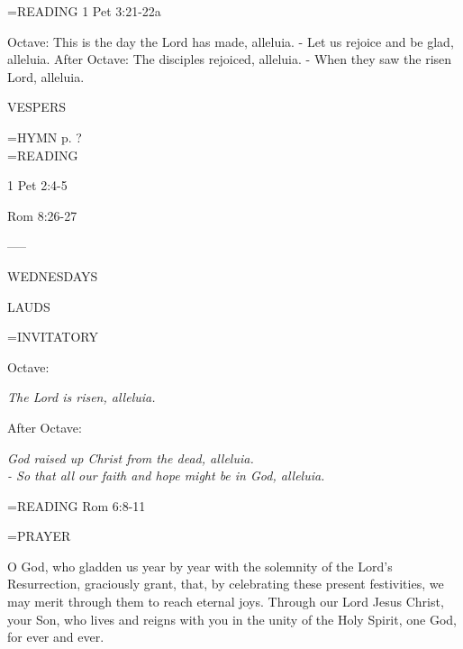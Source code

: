 \hangindent=\parindent \small{READING}    1 Pet 3:21-22a \textbf{   }

Octave:	This is the day the Lord has made, alleluia.
		- Let us rejoice and be glad, alleluia.
After Octave:	The disciples rejoiced, alleluia.
		- When they saw the risen Lord, alleluia.

\begin{flushleft}\normalsize VESPERS\\\end{flushleft}
\hangindent=\parindent \small{\uppercase{HYMN} p.  ?\\}
\hangindent=\parindent \small READING
\begin{description}[labelindent=\parindent, leftmargin=*]
\item [1st-6th Week:]     1 Pet 2:4-5 \textbf{    }
\item [7th Week:]     Rom 8:26-27 \textbf{    }
\end{description}

-----
\begin{center}
\normalsize WEDNESDAYS
\end{center}

\begin{flushleft}\normalsize LAUDS\\\end{flushleft}
\hangindent=\parindent \small{INVITATORY}
\begin{center}
\end{center}Octave:\begin{center}\textit{	The Lord is risen, alleluia.\\}
\end{center}After Octave:\begin{center}\textit{	God raised up Christ from the dead, alleluia.\\}
\textit{		- So that all our faith and hope might be in God, alleluia.\\}
\end{center}

\hangindent=\parindent \small{READING}    Rom 6:8-11 \textbf{   \\}

\hangindent=\parindent \small PRAYER
\begin{description}[labelindent=\parindent, noitemsep, leftmargin=*]
\item [Octave:] 	O God, who gladden us year by year with the solemnity of the Lord's Resurrection, graciously grant, that, by celebrating these present festivities, we may merit through them to reach eternal joys. Through our Lord Jesus Christ, your Son, who lives and reigns with you in the unity of the Holy Spirit, one God, for ever and ever.
\item [After Octave:] 	
\end{description}

